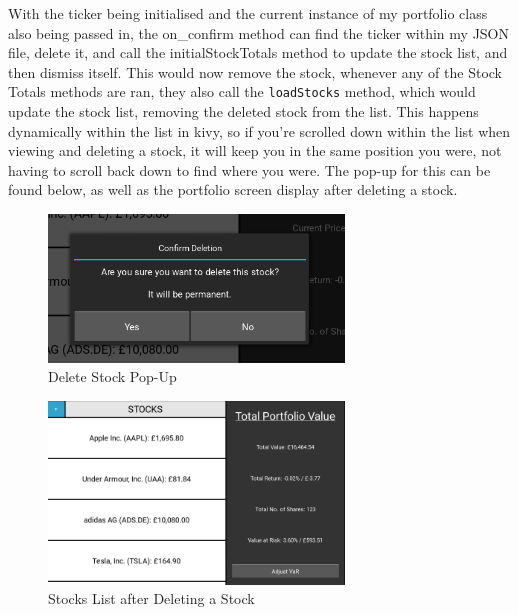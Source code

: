\documentclass{article}
\begin{document}
\vspace{0.3cm}
With the ticker being initialised and the current instance of my portfolio class also being passed in, the on\_confirm method can find the ticker within my JSON file, delete it, and call the initialStockTotals method to update the stock list, and then dismiss itself. This would now remove the stock, whenever any of the Stock Totals methods are ran, they also call the \texttt{loadStocks} method, which would update the stock list, removing the deleted stock from the list. This happens dynamically within the list in kivy, so if you're scrolled down within the list when viewing and deleting a stock, it will keep you in the same position you were, not having to scroll back down to find where you were. The pop-up for this can be found below, as well as the portfolio screen display after deleting a stock. \\\vspace{0.3cm}

\begin{figure}[h]
  \centering
  \includegraphics[width=0.7\textwidth]{Images/Term 2 Images/image (10).png}
  \caption{Delete Stock Pop-Up}
  \label{fig:Delete Stock}
\end{figure}

\begin{figure}[h]
  \centering
  \includegraphics[width=0.7\textwidth]{Images/Term 2 Images/image (13).png}
  \caption{Stocks List after Deleting a Stock}
  \label{fig:Deleted Stocks List}
\end{figure}
\end{document}
